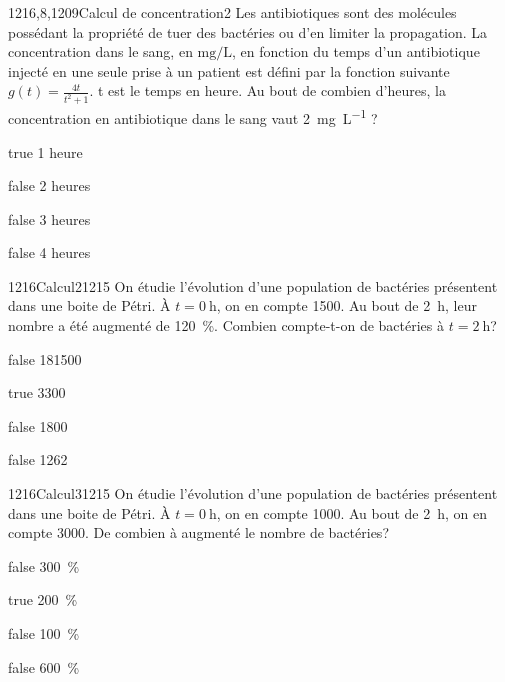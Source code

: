 			\begin{question}{1216,8,1209}{Calcul de concentration}{2}{}
				Les antibiotiques sont des molécules possédant la propriété de tuer des bactéries ou d'en limiter la propagation. La concentration dans le sang, en $\si{\milli\gram\per\liter}$, en fonction du temps d'un antibiotique injecté en une seule prise à un patient est défini par la fonction suivante $g(t) = \frac{4t}{t^{2}+1}$. t est le temps en heure. Au bout de combien d'heures, la concentration en antibiotique dans le sang vaut \SI{2}{\milli\gram\per\liter}  ?
            \end{question}
            \begin{reponses}
            	\item[true] 1 heure
            	\item[false]  2 heures
                \item[false]  3 heures
                \item[false] 4  heures
            \end{reponses}
				\begin{question}{1216}{Calcul}{2}{1215}
                On étudie l'évolution d'une population de bactéries présentent dans une boite de Pétri. À $t=\SI{0}{\hour}$, on en compte \num{1500}. Au bout de \SI{2}{\hour}, leur nombre a été augmenté de \SI{120}{\percent}. Combien compte-t-on de bactéries à $t=\SI{2}{\hour}$?
            \end{question}
            \begin{reponses}
            	\item[false] \num{181500}
            	\item[true]  \num{3300}
                \item[false]  \num{1800}
                \item[false] \num{1262}
            \end{reponses}
			\begin{question}{1216}{Calcul}{3}{1215}
                On étudie l'évolution d'une population de bactéries présentent dans une boite de Pétri. À $t=\SI{0}{\hour}$, on en compte \num{1000}. Au bout de \SI{2}{\hour}, on en compte \num{3000}. De combien à augmenté le nombre de bactéries? 
            \end{question}
            \begin{reponses}
            	\item[false] \SI{300}{\percent}
            	\item[true]  \SI{200}{\percent}
                \item[false] \SI{100}{\percent}
                \item[false] \SI{600}{\percent}
            \end{reponses}
